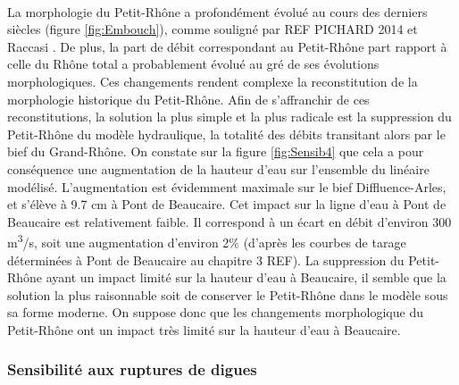\documentclass[11pt]{article}
\begin{document}
	\paragraph{} La morphologie du Petit-Rhône a profondément évolué au cours des derniers siècles (figure \ref{fig:Embouch}), comme souligné par REF PICHARD 2014 et Raccasi \citet{raccasi_mutations_2008}. De plus, la part de débit correspondant au Petit-Rhône part rapport à celle du Rhône total a probablement évolué au gré de ses évolutions morphologiques. Ces changements rendent complexe la reconstitution de la morphologie historique du Petit-Rhône. Afin de s'affranchir de ces reconstitutions, la solution la plus simple et la plus radicale est la suppression du Petit-Rhône du modèle hydraulique, la totalité des débits transitant alors par le bief du Grand-Rhône. On constate sur la figure \ref{fig:Sensib4} que cela a pour conséquence une augmentation de la hauteur d'eau sur l'ensemble du linéaire modélisé. L'augmentation est évidemment maximale sur le bief Diffluence-Arles, et s'élève à 9.7 cm à Pont de Beaucaire. Cet impact sur la ligne d'eau à Pont de Beaucaire est relativement faible. Il correspond à un écart en débit d'environ 300 m\textsuperscript{3}/s, soit une augmentation d'environ 2\% (d'après les courbes de tarage déterminées à Pont de Beaucaire au chapitre 3 REF). La suppression du Petit-Rhône ayant un impact limité sur la hauteur d'eau à Beaucaire, il semble que la solution la plus raisonnable soit de conserver le Petit-Rhône dans le modèle sous sa forme moderne. On suppose donc que les changements morphologique du Petit-Rhône ont un impact très limité sur la hauteur d'eau à Beaucaire.
	
	\subsubsection{Sensibilité aux ruptures de digues}
	
\end{document}
